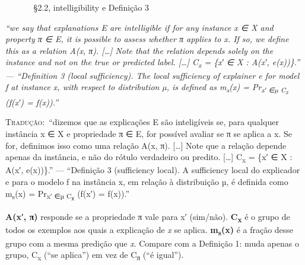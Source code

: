 \documentclass[11pt,a4paper]{article}
\newcommand{\metrictag}[2]{{\setlength{\fboxsep}{1.5pt}%
  \ifstrequal{#1}{c}{\colorbox{cC}{\textcolor{white}{\scriptsize\textbf{#2}}}}{%
  \ifstrequal{#1}{s}{\colorbox{cS}{\textcolor{white}{\scriptsize\textbf{#2}}}}{%
  \colorbox{black!60}{\textcolor{white}{\scriptsize\textbf{#2}}}}}}}
\newcommand{\pagechip}[1]{{\setlength{\fboxsep}{1.5pt}\colorbox{cAcc}{\textcolor{white}{\scriptsize\texttt{#1}}}}}
\newenvironment{origquote}{\par\itshape\small}{\par}
\newenvironment{tradquote}{\par\small\textsc{Tradução:}\ }{\par}
\newcommand{\explab}[1]{\par\smallskip{\small\color{cAcc}\textbf{\MakeUppercase{#1}}}\par}
\begin{document}
\begin{citacard}{\pagechip{p. 5–6} §2.2, intelligibility e Definição 3 \metrictag{s}{S}}
\begin{origquote}“we say that explanations E are intelligible if for any instance x ∈ X and property π ∈ E, it is possible to assess whether π applies to x. If so, we define this as a relation A(x, π). […] Note that the relation depends solely on the instance and not on the true or predicted label. […] C\textsubscript{x} = \{x′ ∈ X : A(x′, e(x))\}.” — “Definition 3 (local sufficiency). The local sufficiency of explainer e for model f at instance x, with respect to distribution µ, is defined as m\textsubscript{s}(x) = Pr\textsubscript{x′ ∈µ C\textsubscript{x}} (f(x′) = f(x)).”\end{origquote}
\begin{tradquote}“dizemos que as explicações E são inteligíveis se, para qualquer instância x ∈ X e propriedade π ∈ E, for possível avaliar se π se aplica a x. Se for, definimos isso como uma relação A(x, π). […] Note que a relação depende apenas da instância, e não do rótulo verdadeiro ou predito. […] C\textsubscript{x} = \{x′ ∈ X : A(x′, e(x))\}.” — “Definição 3 (sufficiency local). A sufficiency local do explicador e para o modelo f na instância x, em relação à distribuição µ, é definida como m\textsubscript{s}(x) = Pr\textsubscript{x′ ∈µ C\textsubscript{x}} (f(x′) = f(x)).”\end{tradquote}
\explab{Explicação}
\textbf{A(x′, π)} responde se a propriedade π vale para x′ (sim/não). \textbf{C\textsubscript{x}} é o grupo de todos os exemplos aos quais a explicação de \textit{x} se aplica. \textbf{m\textsubscript{s}(x)} é a fração desse grupo com a mesma predição que \textit{x}. Compare com a Definição 1: muda apenas o grupo, C\textsubscript{x} (“se aplica”) em vez de C\textsubscript{π} (“é igual”).
\end{citacard}
\end{document}

